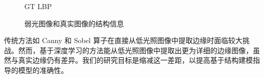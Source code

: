 \documentclass[CJK,aspectratio=169]{beamer}  %
\begin{document}
\begin{frame}
\begin{figure}
\begin{minipage}{.19\textwidth}
				\caption*{\tiny GT LBP}
				\label{fig: GT_lbp}	
			\end{minipage}
			\captionsetup{font=scriptsize}
			\caption{
				\label{fig: LLI Structure Information}
				\tiny 弱光图像和真实图像的结构信息
			}
		\end{figure}
		
		\vspace{-0.5cm}
		
		{ \yahei 传统方法如 Canny 和 Sobel 算子\textcolor{blue}{\cite{maini2009study}}在直接从低光照图像中提取边缘时面临较大挑战。然而，基于深度学习的方法能从低光照图像中提取出更为详细的边缘图像，虽然与真实边缘仍有差异。我们的研究目标是缩减这一差距，以提高基于结构建模指导的模型的准确性。}
	\end{frame}
	
%		
%			
%			
%			
%		
\end{document}
